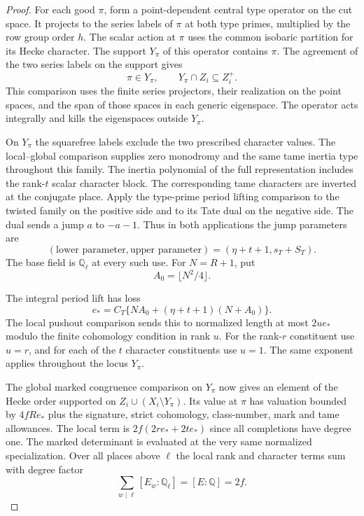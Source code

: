 \begin{proof}
For each good \(\pi\), form a point-dependent central
type operator on the cut space. It projects to the
series labels of \(\pi\) at both type primes, multiplied
by the row group order \(h\). The scalar action at \(\pi\)
uses the common isobaric partition for its Hecke
character. The support \(Y_\pi\) of this operator
contains \(\pi\). The agreement of the two series labels on the support gives
\[
 \pi\in Y_\pi,\qquad Y_\pi\cap Z_i\subseteq Z_i^+.
\]
This comparison
uses the finite series projectors, their realization on
the point spaces, and the span of those spaces in
each generic eigenspace. The operator acts integrally
and kills the eigenspaces outside \(Y_\pi\).

On \(Y_\pi\) the squarefree labels exclude the two
prescribed character values. The local--global
comparison supplies zero monodromy and the same
tame inertia type throughout this family. The inertia
polynomial of the full representation includes the
rank-\(t\) scalar character block. The corresponding
tame characters are inverted at the conjugate place.
Apply the type-prime period lifting comparison to the
twisted family on the positive side and to its Tate
dual on the negative side. The dual sends a jump \(a\) to \(-a-1\). Thus in both applications the jump parameters are
\[
 (\text{lower parameter},\text{upper parameter})=(\eta+t+1,s_T+S_T).
\]
The base field is \(\mathbb Q_\ell\) at every such use.
For \(N=R+1\), put
\[
 A_0=\lfloor N^2/4\rfloor.
\]

The integral period lift has loss
\[
 e_*=C_T\{N A_0+(\eta+t+1)(N+A_0)\}.
\]
The local pushout comparison sends this to normalized
length at most \(2u e_*\) modulo the finite
cohomology condition in rank \(u\). For the rank-\(r\)
constituent use \(u=r\), and for each of the \(t\)
character constituents use \(u=1\).
The same exponent applies throughout the locus \(Y_\pi\).
\label{cor:special-prime-lengths-5}

The global marked congruence comparison on \(Y_\pi\)
now gives an element of the Hecke order supported
on \(Z_i\cup(X_i\setminus Y_\pi)\). Its value at
\(\pi\) has valuation bounded by \(4fR e_*\)
plus the signature, strict cohomology, class-number,
mark and tame allowances. The local term is
\(2f(2re_*+2te_*)\) since all completions have
degree one. The marked determinant is evaluated at the very same normalized specialization. Over all places above \(\ell\) the local rank and character terms sum with degree factor
\[
 \sum_{w\mid\ell}[E_w:\mathbb Q_\ell]=[E:\mathbb Q]=2f.
\]


\end{proof}
